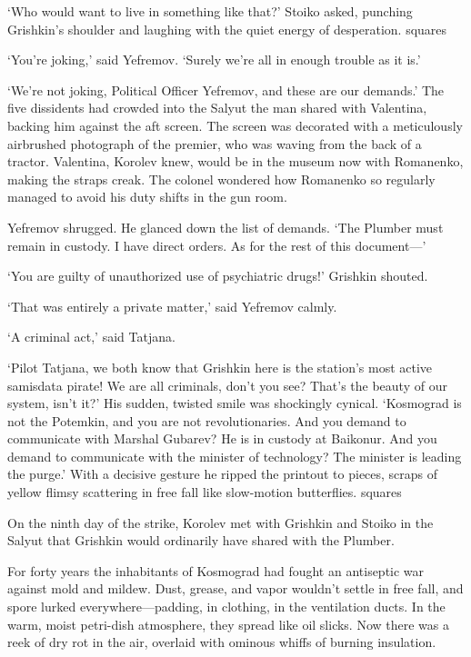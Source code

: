‘Who would want to live in something like that?’ Stoiko asked, punching Grishkin’s shoulder and laughing with the quiet energy of desperation.
squares

‘You’re joking,’ said Yefremov. ‘Surely we’re all in enough trouble as it is.’

‘We’re not joking, Political Officer Yefremov, and these are our demands.’ The five dissidents had crowded into the Salyut the man shared with Valentina, backing him against the aft screen. The screen was decorated with a meticulously airbrushed photograph of the premier, who was waving from the back of a tractor. Valentina, Korolev knew, would be in the museum now with Romanenko, making the straps creak. The colonel wondered how Romanenko so regularly managed to avoid his duty shifts in the gun room.

Yefremov shrugged. He glanced down the list of demands. ‘The Plumber must remain in custody. I have direct orders. As for the rest of this document—’

‘You are guilty of unauthorized use of psychiatric drugs!’ Grishkin shouted.

‘That was entirely a private matter,’ said Yefremov calmly.

‘A criminal act,’ said Tatjana.

‘Pilot Tatjana, we both know that Grishkin here is the station’s most active samisdata pirate! We are all criminals, don’t you see? That’s the beauty of our system, isn’t it?’ His sudden, twisted smile was shockingly cynical. ‘Kosmograd is not the Potemkin, and you are not revolutionaries. And you demand to communicate with Marshal Gubarev? He is in custody at Baikonur. And you demand to communicate with the minister of technology? The minister is leading the purge.’ With a decisive gesture he ripped the printout to pieces, scraps of yellow flimsy scattering in free fall like slow-motion butterflies.
squares

On the ninth day of the strike, Korolev met with Grishkin and Stoiko in the Salyut that Grishkin would ordinarily have shared with the Plumber.

For forty years the inhabitants of Kosmograd had fought an antiseptic war against mold and mildew. Dust, grease, and vapor wouldn’t settle in free fall, and spore lurked everywhere—padding, in clothing, in the ventilation ducts. In the warm, moist petri-dish atmosphere, they spread like oil slicks. Now there was a reek of dry rot in the air, overlaid with ominous whiffs of burning insulation.

